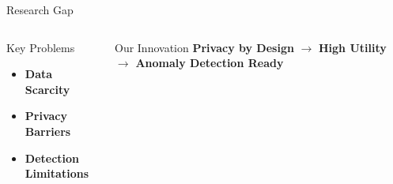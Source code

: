 \documentclass[aspectratio=169,xcolor={dvipsnames}]{beamer}
\newcommand{\highlight}[1]{\textcolor{RustyNail}{\textbf{#1}}}
\begin{document}
\begin{frame}{Research Gap}
  \begin{columns}[T,onlytextwidth]
    \begin{column}{0.48\textwidth}
      \begin{block}{Key Problems}
        \begin{itemize}
          \item \highlight{Data Scarcity}
          \item \highlight{Privacy Barriers}
          \item \highlight{Detection Limitations}
        \end{itemize}
      \end{block}
    \end{column}
    \hspace{0.04\textwidth}
    \begin{column}{0.48\textwidth}
      \begin{block}{Our Innovation}
        \centering
        \textbf{Privacy by Design} $\rightarrow$ \textbf{High Utility} $\rightarrow$ \textbf{Anomaly Detection Ready}
      \end{block}
    \end{column}
  \end{columns}
\end{frame}
\end{document}
